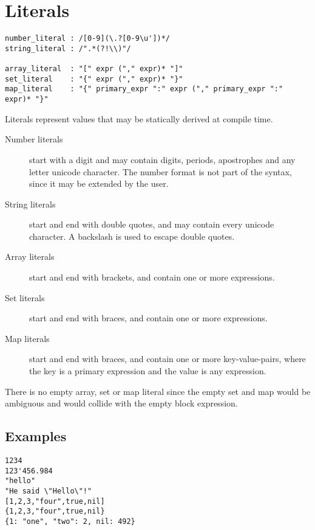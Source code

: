\section{Literals}

\begin{lstlisting}[language=EBNF]
number_literal : /[0-9](\.?[0-9\u'])*/
string_literal : /".*(?!\\)"/

array_literal  : "[" expr ("," expr)* "]"
set_literal    : "{" expr ("," expr)* "}"
map_literal    : "{" primary_expr ":" expr ("," primary_expr ":" expr)* "}"
\end{lstlisting}

Literals represent values that may be statically derived at compile time.

\begin{description}
	\item[Number literals] start with a digit and may contain digits, periods,
		apostrophes and any letter unicode character. The number format is not
		part of the syntax, since it may be extended by the user.
	\item[String literals] start and end with double quotes, and may contain
		every unicode character. A backslash is used to escape double quotes.
	\item[Array literals] start and end with brackets, and contain one or more
		expressions.
	\item[Set literals] start and end with braces, and contain one or more
		expressions.
	\item[Map literals] start and end with braces, and contain one or more
		key-value-pairs, where the key is a primary expression and the value is
		any expression.
\end{description}

There is no empty array, set or map literal since the empty set and map would be
ambiguous and would collide with the empty block expression.

\subsection{Examples}

\begin{lstlisting}
1234
123'456.984
"hello"
"He said \"Hello\"!"
[1,2,3,"four",true,nil]
{1,2,3,"four",true,nil}
{1: "one", "two": 2, nil: 492}
\end{lstlisting}
